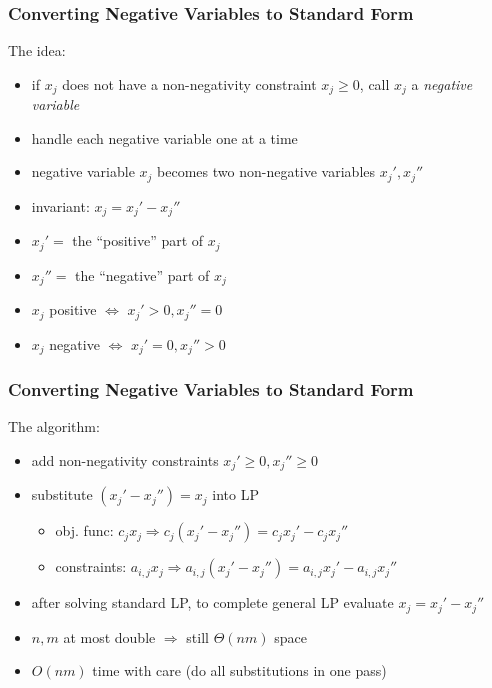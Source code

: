 \documentclass{beamer}
\begin{document}
\begin{frame} \frametitle{Converting Negative Variables to Standard Form}
The idea:
  \begin{itemize}
    \item if $x_j$ does not have a non-negativity constraint $x_j \geq 0$,
      call $x_j$ a \emph{negative variable}
    \item handle each negative variable one at a time
    \item negative variable $x_j$ becomes two non-negative variables $x_j', x_j''$
    \item invariant: $x_j = x_j'-x_j''$
    \item $x_j' = $ the ``positive'' part of $x_j$
    \item $x_j'' = $ the ``negative'' part of $x_j$
    \item $x_j $ positive $\Longleftrightarrow$ $x_j'>0, x_j''=0$
    \item $x_j $ negative $\Longleftrightarrow$ $x_j'=0, x_j''>0$
  \end{itemize}
\end{frame}

\begin{frame} \frametitle{Converting Negative Variables to Standard Form}
  The algorithm:
  \begin{itemize}
    \item add non-negativity constraints $x_j' \geq 0, x_j'' \geq 0$
    \item substitute $(x_j'-x_j'')=x_j$ into LP
    \begin{itemize}
      \item obj. func: $c_j x_j \Rightarrow c_j(x_j'-x_j'')=c_j x_j' - c_j x_j''$
      \item constraints: $a_{i,j} x_j \Rightarrow a_{i,j} (x_j'-x_j'') = a_{i, j} x_j' - a_{i, j} x_j''$
    \end{itemize}
    \item after solving standard LP, to complete general LP evaluate $x_j=x_j'-x_j''$
    \item $n, m$ at most double $\Rightarrow$ still $\Theta(nm)$ space
    \item $O(nm)$ time with care (do all substitutions in one pass)
  \end{itemize}
\end{frame}
\end{document}
